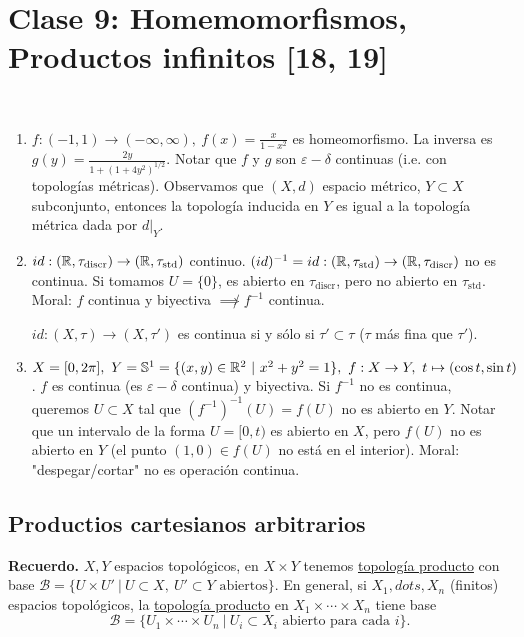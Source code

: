 
\section{Clase 9: Homemomorfismos, Productos infinitos [18, 19]}

\begin{eg}~
	\begin{enumerate}
		\item $f: (-1,1) \to (-\infty,\infty),\ f(x) = \frac{x}{1-x^2}$ es homeomorfismo. La inversa es $g(y) = \frac{2y}{1+(1+4y^2)^{1/2}}$. Notar que $f$ y $g$ son $\varepsilon-\delta$ continuas (i.e. con topologías métricas). Observamos que $(X,d)$ espacio métrico, $Y\subset X$ subconjunto, entonces la topología inducida en $Y$ es igual a la topología métrica dada por $d|_{Y}$.

		\item $id : (\mathbb{R},\tau_{\text{discr}})\to(\mathbb{R},\tau_{\text{std}})$ continuo. $(id)^{-1} = id: (\mathbb{R},\tau_{\text{std}}) \to (\mathbb{R}, \tau_{\text{discr}})$ no es continua. Si tomamos $U = \{0\}$, es abierto en $\tau_{\text{discr}}$, pero no abierto en $\tau_{\text{std}}$. Moral: $f$ continua y biyectiva $\not\implies f^{-1}$ continua. 
		\begin{remark}
			$id: (X,\tau) \to (X,\tau')$ es continua si y sólo si $\tau' \subset \tau$ ($\tau$ más fina que $\tau'$).
		\end{remark}

		\item $X = [0,2\pi],\ Y = \mathbb{S}^1 = \{(x,y) \in \mathbb{R}^2 \ | \ x^2 + y^2 = 1 \},\ f: X \to Y,\ t \mapsto (\cos t,\sin t)$. $f$ es continua (es $\varepsilon-\delta$ continua) y biyectiva. Si $f^{-1}$ no es continua, queremos $U\subset X$ tal que $(f^{-1})^{-1}(U) = f(U)$ no es abierto en $Y$. Notar que un intervalo de la forma $U = [0,t)$ es abierto en $X$, pero $f(U)$ no es abierto en $Y$ (el punto $(1,0) \in f(U)$ no está en el interior). Moral: "despegar/cortar" no es operación continua.
	\end{enumerate}
\end{eg}

\subsection{Productios cartesianos arbitrarios}

\noindent \textbf{Recuerdo.} $X,Y$ espacios topológicos, en $X\times Y$ tenemos \underline{topología producto} con base $\mathcal{B} = \{ U\times U' \ | \ U \subset X,\ U'\subset Y \text{ abiertos} \}$. En general, si $X_1,dots,X_n$ (finitos) espacios topológicos, la \underline{topología producto} en $X_1\times \cdots \times X_n$ tiene base
\[ \mathcal{B} = \{ U_1 \times \cdots \times U_n \ | \ U_i \subset X_i \text{ abierto para cada } i \}. \]

